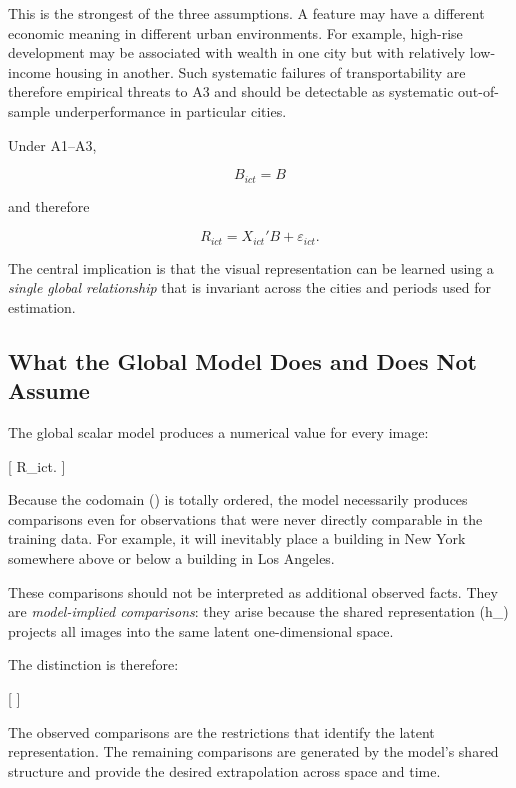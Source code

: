 This is the strongest of the three assumptions. A feature may have a different economic meaning in different urban environments. For example, high-rise development may be associated with wealth in one city but with relatively low-income housing in another. Such systematic failures of transportability are therefore empirical threats to A3 and should be detectable as systematic out-of-sample underperformance in particular cities.

Under A1--A3,

\begin{equation}
B_{ict}=B
\end{equation}

and therefore

\begin{equation}
\boxed{
R_{ict}=X_{ict}'B+\varepsilon_{ict}.
}
\label{eq:global_latent_model}
\end{equation}

The central implication is that the visual representation can be learned using a \emph{single global relationship} that is invariant across the cities and periods used for estimation.

\subsection{What the Global Model Does and Does Not Assume}

The global scalar model produces a numerical value for every image:

[
\hat R_{ict}\in{}.
]

Because the codomain () is totally ordered, the model necessarily produces comparisons even for observations that were never directly comparable in the training data. For example, it will inevitably place a building in New York somewhere above or below a building in Los Angeles.

These comparisons should not be interpreted as additional observed facts. They are \emph{model-implied comparisons}: they arise because the shared representation (h_{\theta}) projects all images into the same latent one-dimensional space.

The distinction is therefore:

[
]

The observed comparisons are the restrictions that identify the latent representation. The remaining comparisons are generated by the model's shared structure and provide the desired extrapolation across space and time.

